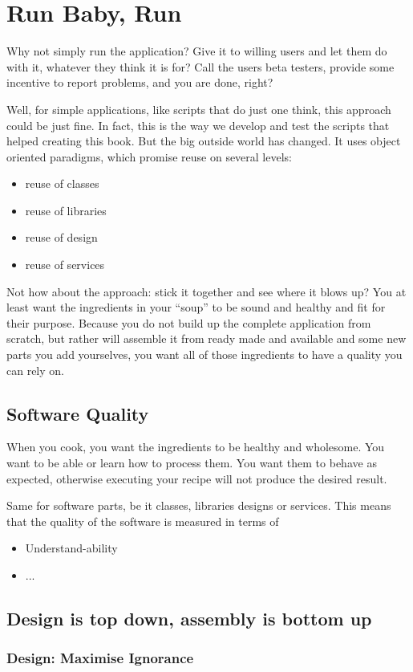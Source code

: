\documentclass[\docroot/main]{subfiles}
\begin{document}
\chapter{Run Baby, Run}
Why not simply run the application?
Give it to willing users and let them do with it, whatever they think it is for?
Call the users beta testers, provide some incentive to report problems, and you are done, right?

Well, for simple applications, like scripts that do just one think,
this approach could be just fine. In fact, this is the way we develop
and test the scripts that helped creating this book. But the big
outside world has changed. It uses object oriented paradigms, which
promise  reuse on several levels:
\begin{itemize}
\item reuse of classes
\item reuse of libraries
\item reuse of design
\item reuse of services
\end{itemize}

Not how about the approach: stick it together and see where it blows
up? You at least want the ingredients in your ``soup'' to be sound and
healthy and fit for their purpose. Because you do not build up the
complete application from scratch, but rather will assemble it from
ready made and available and some new parts you add yourselves, you
want all of those ingredients to have a quality you can rely on.

\section{Software Quality}
When you cook, you want the ingredients to be healthy and wholesome.
You want to be able or learn how to process them. You want them to
behave as expected, otherwise executing your recipe will not  produce
the desired result. 

Same for software parts, be it classes, libraries designs or services.
This means that the quality of the software is measured in terms of
\begin{itemize}
\item Understand-ability
\item ...
\end{itemize}

\section{Design is top down, assembly is bottom up}

\subsection{Design: Maximise Ignorance}
\end{document}
